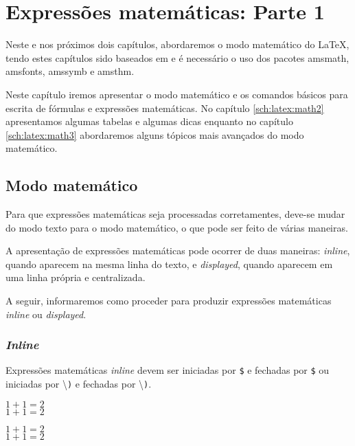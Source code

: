 % 
% 
% 
% 
% 
\chapter{Expressões matemáticas: Parte 1} \label{sch:latex:math1}
Neste e nos próximos dois capítulos, abordaremos o modo matemático do LaTeX, tendo estes capítulos sido baseados em \cite{Graetzer:2007:MoreMath} e é necessário o uso dos pacotes \textsf{amsmath}, \textsf{amsfonts}, \textsf{amssymb} e \textsf{amsthm}.

Neste capítulo iremos apresentar o modo matemático e os comandos básicos para escrita de fórmulas e expressões matemáticas. No capítulo \ref{sch:latex:math2} apresentamos algumas tabelas e algumas dicas enquanto no capítulo \ref{sch:latex:math3} abordaremos alguns tópicos mais avançados do modo matemático.

\section{Modo matemático}
Para que expressões matemáticas seja processadas corretamentes, deve-se mudar do modo texto para o modo matemático, o que pode ser feito de várias maneiras.

A apresentação de expressões matemáticas pode ocorrer de duas maneiras: \textit{inline}, quando aparecem na mesma linha do texto, e \textit{displayed}, quando aparecem em uma linha própria e centralizada.

A seguir, informaremos como proceder para produzir expressões matemáticas \textit{inline} ou \textit{displayed}.

\subsection{\textit{Inline}}
Expressões matemáticas \textit{inline} devem ser iniciadas por \texttt{\$} e fechadas por \texttt{\$} ou iniciadas por \textbackslash\texttt{)} e fechadas por \textbackslash\texttt{)}. \\
\begin{minipage}[t]{0.47\linewidth} \vspace{-8pt}
    \begin{latexcode}
        $1 + 1 = 2$ \\
        \(1 + 1 = 2\)
    \end{latexcode}
\end{minipage} \hfill
\begin{minipage}[t]{0.47\linewidth} \vspace{0pt}
    $1 + 1 = 2$ \\
    \(1 + 1 = 2\)
\end{minipage}

